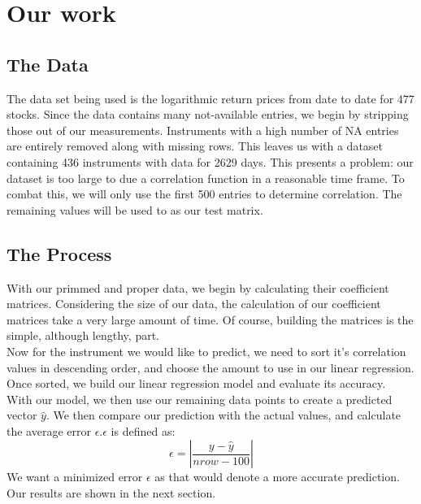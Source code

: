 \documentclass[10pt]{siamltex}
\begin{document}
\section{Our work}    \label{sec:ourWork}
\subsection{The Data}

The data set being used is the logarithmic return prices from date to date for 477 stocks. Since the data contains many not-available entries, we begin by stripping those out of our measurements. Instruments with a high number of NA entries are entirely removed along with missing rows. This leaves us with a dataset containing 436 instruments with data for 2629 days. This presents a problem: our dataset is too large to due a correlation function in a reasonable time frame. To combat this, we will only use the first 500 entries to determine correlation. The remaining values will be used to as our test matrix.

\subsection{The Process}
With our primmed and proper data, we begin by calculating their coefficient matrices. Considering the size of our data, the calculation of our coefficient matrices take a very large amount of time. 
Of course, building the matrices is the simple, although lengthy, part. \vspace{5mm}\\
Now for the instrument we would like to predict, we need to sort it's correlation values in descending order, and choose the amount to use in our linear regression. Once sorted, we build our linear regression model and evaluate its accuracy. \vspace{5mm} \\
With our model, we then use our remaining data points to create a predicted vector $\hat{y}$. We then compare our prediction with the actual values, and calculate the average error $\epsilon$.$\epsilon$ is defined as:
\begin{equation}
\epsilon = |\frac{y - \hat{y}}{nrow - 100}|
\end{equation}
We want a minimized error $\epsilon$ as that would denote a more accurate prediction. Our results are shown in the next section.
\newpage
\end{document}
